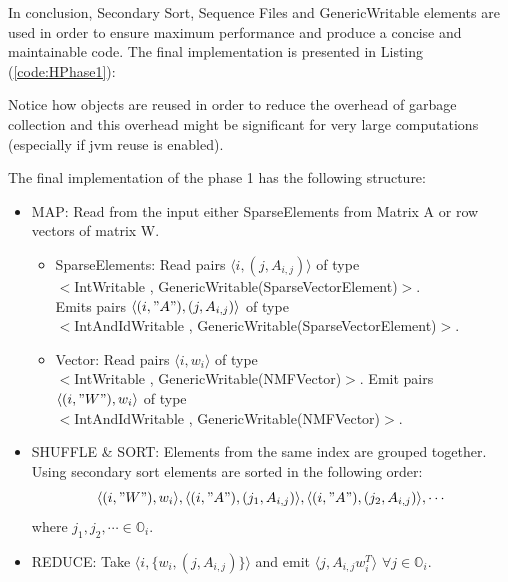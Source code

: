 \documentclass[a4paper,12pt]{article}
\begin{document}
In conclusion, Secondary Sort, Sequence Files and GenericWritable elements are used in order to ensure maximum performance and produce a concise and maintainable code.
The final implementation is presented in Listing (\ref{code:HPhase1}):
 
Notice how objects are reused in order to reduce the overhead of garbage collection and this overhead might be significant for very large computations (especially if jvm reuse is enabled).

The final implementation of the phase 1 has the following structure:

        \begin{itemize}
        
          \item MAP: Read from the input either SparseElements from Matrix A  or  row vectors of matrix W.
          \begin{itemize}
          
          \item SparseElements: Read pairs $\langle i,( j, A_{i,j}) \rangle $ of type \\
          $<$IntWritable , GenericWritable(SparseVectorElement)$>$.
          \\
          Emits pairs $\langle (i,"A"),( j, A_{i,j}) \rangle $ of type \\ 
          $<$IntAndIdWritable , GenericWritable(SparseVectorElement)$>$.
          
          \item Vector: Read pairs $\langle i, w_i \rangle$ of type \\
          $<$IntWritable , GenericWritable(NMFVector)$>$.
          Emit pairs $\langle (i,"W"), w_i \rangle$ of type \\
          $<$IntAndIdWritable , GenericWritable(NMFVector)$>$.          
          \end{itemize}

		\item SHUFFLE \& SORT: Elements from the same index are grouped together.
		Using secondary sort elements are sorted in the following order: $$\langle (i,"W"), w_i \rangle,\langle (i,"A"),( j_1, A_{i,j}) \rangle , \langle (i,"A"),( j_2, A_{i,j}) \rangle , \cdots$$ where $j_1,j_2,\cdots \in \mathbb{O}_i $.
			
         \item REDUCE: Take  $ \langle i, \{w_{i}, (j, A_{i,j}) \}
           \rangle$ and emit  $ \langle j, A_{i,j}  w_{i}^{T}
           \rangle$ $\forall j \in \mathbb{O}_i $.

         \end{itemize}
\end{document}
